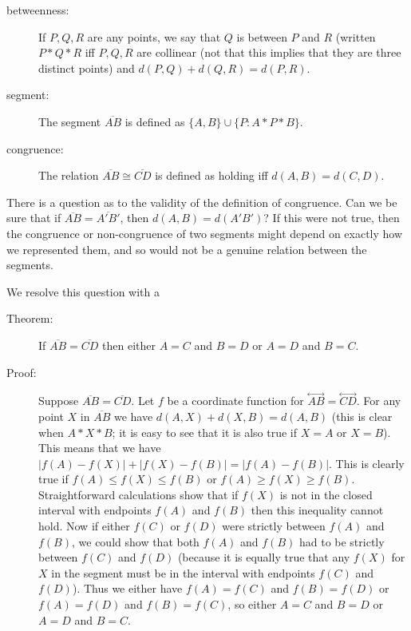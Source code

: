 \documentclass[12pt]{article}
\newcommand\Line[1]{\overset{\leftrightarrow}{#1}}
\begin{document}
\begin{description}

\item[betweenness:]  If $P,Q,R$ are any points, we  say that $Q$ is between $P$ and $R$ (written $P * Q * R$ iff $P,Q,R$ are collinear (not that this implies that they are three distinct points) and $d(P,Q)+d(Q,R)=d(P,R)$.

\item[segment:]  The segment $\overline{AB}$ is defined as $\{A,B\} \cup \{P:A*P*B\}$.

\item[congruence:]  The relation $\overline{AB} \cong \overline{CD}$ is defined as holding iff $d(A,B)=d(C,D)$. 

\end{description}

There is a question as to the validity of the definition of congruence.  Can we be sure that if $\overline{AB} = \overline{A'B'}$, then $d(A,B)=d(A'B')$?  If this were not true, then the congruence or non-congruence of two segments might depend on exactly how we represented them, and so would not be a genuine relation between the segments.

We resolve this question with a 

\begin{description}

\item[Theorem:]  If $\overline{AB} = \overline{CD}$ then either $A=C$ and $B=D$ or $A=D$ and $B=C$.

\item[Proof:]  Suppose $\overline{AB} = \overline{CD}$.  Let $f$ be a coordinate function for $\Line{AB}=\Line{CD}$.  For any point $X$ in $\overline{AB}$ we have
$d(A,X) + d(X,B) = d(A,B)$ (this is clear when $A*X*B$;  it is easy to see that it is also true if $X=A$ or $X=B$).  This means that we have $|f(A)-f(X)| + |f(X)-f(B)| = |f(A)-f(B)|$.
This is clearly true if $f(A) \leq f(X) \leq f(B)$ or $f(A) \geq f(X) \geq f(B)$.  Straightforward calculations show that if $f(X)$ is not in the closed interval with endpoints
$f(A)$ and $f(B)$ then this inequality cannot hold.  Now if either $f(C)$ or $f(D)$ were strictly between $f(A)$ and $f(B)$, we could show that both $f(A)$ and $f(B)$ had to be strictly between $f(C)$ and $f(D)$ (because it is equally true that any $f(X)$ for $X$ in the segment must be in the interval with endpoints $f(C)$ and $f(D)$).  Thus we either have 
$f(A)=f(C)$ and $f(B)=f(D)$ or $f(A)=f(D)$ and $f(B)=f(C)$, so either $A=C$ and $B=D$ or $A=D$ and $B=C$.

\end{description}
\end{document}
